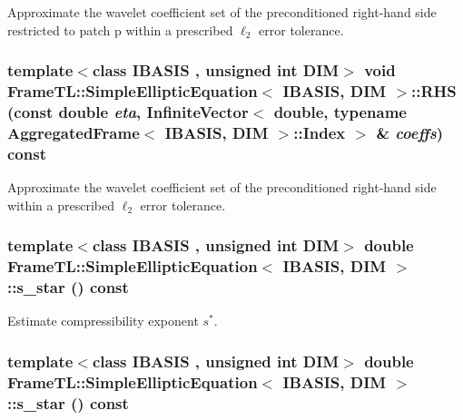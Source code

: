Approximate the wavelet coefficient set of the preconditioned right-hand side restricted to patch p within a prescribed $\ell_2$ error tolerance. \hypertarget{classFrameTL_1_1SimpleEllipticEquation_2062b30008f73db23fa8b7415016ca00}{
\subsubsection[{RHS}]{\setlength{\rightskip}{0pt plus 5cm}template$<$class IBASIS , unsigned int DIM$>$ void {\bf FrameTL::SimpleEllipticEquation}$<$ IBASIS, DIM $>$::RHS (const double {\em eta}, \/  InfiniteVector$<$ double, typename {\bf AggregatedFrame}$<$ IBASIS, DIM $>$::{\bf Index} $>$ \& {\em coeffs}) const}}
\label{classFrameTL_1_1SimpleEllipticEquation_2062b30008f73db23fa8b7415016ca00}


Approximate the wavelet coefficient set of the preconditioned right-hand side within a prescribed $\ell_2$ error tolerance. \hypertarget{classFrameTL_1_1SimpleEllipticEquation_26ed425b0ab5dc516bd626730d08c4af}{
\subsubsection[{s\_\-star}]{\setlength{\rightskip}{0pt plus 5cm}template$<$class IBASIS , unsigned int DIM$>$ double {\bf FrameTL::SimpleEllipticEquation}$<$ IBASIS, DIM $>$::s\_\-star () const}}
\label{classFrameTL_1_1SimpleEllipticEquation_26ed425b0ab5dc516bd626730d08c4af}


Estimate compressibility exponent $s^\ast$. \hypertarget{classFrameTL_1_1SimpleEllipticEquation_26ed425b0ab5dc516bd626730d08c4af}{
\subsubsection[{s\_\-star}]{\setlength{\rightskip}{0pt plus 5cm}template$<$class IBASIS , unsigned int DIM$>$ double {\bf FrameTL::SimpleEllipticEquation}$<$ IBASIS, DIM $>$::s\_\-star () const}}
\label{classFrameTL_1_1SimpleEllipticEquation_26ed425b0ab5dc516bd626730d08c4af}


